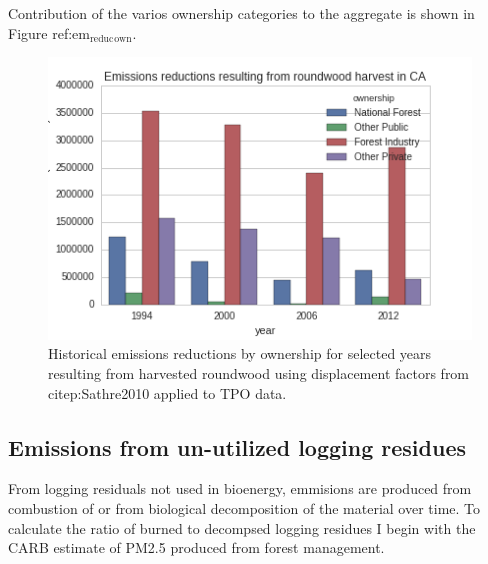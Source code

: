 \documentclass[a4paper]{article}
\begin{document}
Contribution of the varios ownership categories to the aggregate is
shown in Figure ref:em$_{\text{reduc}}$$_{\text{own}}$.

\begin{figure}[htb]
\centering
\includegraphics[width=.9\linewidth]{./graphics/harv_em_reductions.png}
\caption{\label{em_reduc_own}Historical emissions reductions by ownership for selected years resulting from harvested roundwood using displacement factors from citep:Sathre2010 applied to TPO data.}
\end{figure}

\subsection{Emissions from un-utilized logging residues}
\label{sec-3-4}

From logging residuals not used in bioenergy, emmisions are produced
from combustion of or from biological decomposition of the
material over time. To calculate the ratio of burned to decompsed
logging residues I begin with the CARB estimate of PM2.5 produced from
forest management. 
\end{document}
